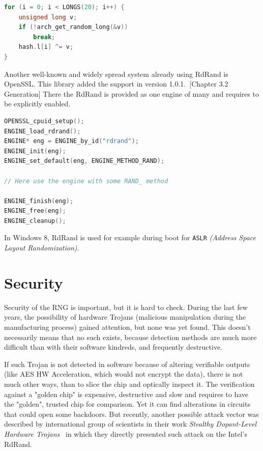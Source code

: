 \begin{lstlisting}[frame=none, basicstyle=\footnotesize\ttfamily, language=C, numbers=none, numberstyle=\tiny\color{black},caption= {Adding RdRand (and any other platform-depending HW RNG) to blocking pool with XOR, at line 1042 in {\tt drivers/char/random.c}.~\cite{random.c}}]
for (i = 0; i < LONGS(20); i++) {
	unsigned long v;
	if (!arch_get_random_long(&v))
		break;
	hash.l[i] ^= v;
}
\end{lstlisting}

\par{
Another well-known and widely spread system already using RdRand is OpenSSL. This library added the support in version 1.0.1.~\cite{OpenSSLRandomNumbers}[Chapter 3.2 Generation] There the RdRand is provided as one engine of many and requires to be explicitly enabled.
}

\begin{lstlisting}[frame=none, basicstyle=\footnotesize\ttfamily, language=C, numbers=none, numberstyle=\tiny\color{black},caption= {Simplified example of usage of RdRand in OpenSSL~\cite{OpenSSLRandomNumbers}. }]
OPENSSL_cpuid_setup();
ENGINE_load_rdrand();
ENGINE* eng = ENGINE_by_id("rdrand");
ENGINE_init(eng);
ENGINE_set_default(eng, ENGINE_METHOD_RAND);

// Here use the engine with some RAND_ method

ENGINE_finish(eng);
ENGINE_free(eng);
ENGINE_cleanup();
\end{lstlisting}

\par{
In Windows 8, RdRand is used for example during boot for {\tt ASLR} {\em (Address Space Layout Randomization)}.~\cite{WindowsASLR,WindowsHeap}
}

\section{Security}\label{sec:security}
\par{
Security of the RNG is important, but it is hard to check. During the last few years,
 the possibility of hardware Trojans (malicious manipulation during 
 the manufacturing process) gained attention, but none was yet found. This doesn't 
necessarily means that no such exists, because detection methods are 
much more difficult than with their software kindreds, and frequently destructive. 
}

\par{
If such Trojan is not detected in software because of altering verifiable outputs 
(like AES HW Acceleration, which would not encrypt the data), 
there is not much other ways, than to slice the chip and optically inspect it. 
The verification against a "golden chip" is expensive, destructive and slow 
and requires to have the "golden", trusted chip for comparison.
Yet it can find alterations in circuits that could open some backdoors. 
But recently, another possible attack vector was described by international group
 of scientists in their work {\em Stealthy Dopant-Level Hardware Trojans}~\cite{DopantAttack} 
 in which they directly presented such attack on the Intel's RdRand.
}

